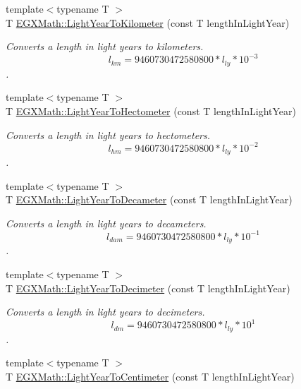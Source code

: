 \begin{DoxyCompactItemize}
{\footnotesize template$<$typename T $>$ }\\T \mbox{\hyperlink{group___e_g_x_math-_conversions-_length_conversions-_astronomical-_light_year-_s_i_gae13805b5330d0024a1845884a84fd076}{E\+G\+X\+Math\+::\+Light\+Year\+To\+Kilometer}} (const T length\+In\+Light\+Year)
\begin{DoxyCompactList}\small\item\em Converts a length in light years to kilometers. \[ l_{km}=9460730472580800 * l_{ly} * 10^{-3} \]. \end{DoxyCompactList}\item 
{\footnotesize template$<$typename T $>$ }\\T \mbox{\hyperlink{group___e_g_x_math-_conversions-_length_conversions-_astronomical-_light_year-_s_i_ga50631edbbd7f5eef1f092138657c725e}{E\+G\+X\+Math\+::\+Light\+Year\+To\+Hectometer}} (const T length\+In\+Light\+Year)
\begin{DoxyCompactList}\small\item\em Converts a length in light years to hectometers. \[ l_{hm}=9460730472580800 * l_{ly} * 10^{-2} \]. \end{DoxyCompactList}\item 
{\footnotesize template$<$typename T $>$ }\\T \mbox{\hyperlink{group___e_g_x_math-_conversions-_length_conversions-_astronomical-_light_year-_s_i_gad178f20a1bc896b522fc17f636fbfdc0}{E\+G\+X\+Math\+::\+Light\+Year\+To\+Decameter}} (const T length\+In\+Light\+Year)
\begin{DoxyCompactList}\small\item\em Converts a length in light years to decameters. \[ l_{dam}=9460730472580800 * l_{ly} * 10^{-1} \]. \end{DoxyCompactList}\item 
{\footnotesize template$<$typename T $>$ }\\T \mbox{\hyperlink{group___e_g_x_math-_conversions-_length_conversions-_astronomical-_light_year-_s_i_ga62936f6c3e97506e1c7a818b61ab90c9}{E\+G\+X\+Math\+::\+Light\+Year\+To\+Decimeter}} (const T length\+In\+Light\+Year)
\begin{DoxyCompactList}\small\item\em Converts a length in light years to decimeters. \[ l_{dm}=9460730472580800 * l_{ly} * 10^{1} \]. \end{DoxyCompactList}\item 
{\footnotesize template$<$typename T $>$ }\\T \mbox{\hyperlink{group___e_g_x_math-_conversions-_length_conversions-_astronomical-_light_year-_s_i_ga25de36bdf4c3baef9594a03a8c986957}{E\+G\+X\+Math\+::\+Light\+Year\+To\+Centimeter}} (const T length\+In\+Light\+Year)

\end{DoxyCompactItemize}
